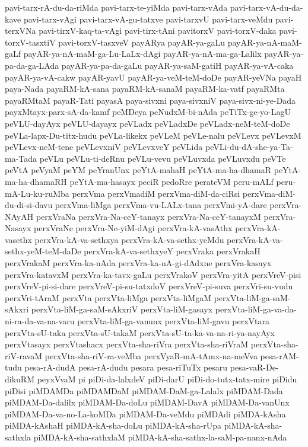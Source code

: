 {pavi-tarx-rA-du-da-riMda
pavi-tarx-te-yiMda
pavi-tarx-vAda
pavi-tarx-vA-du-da-kave
pavi-tarx-vAgi
pavi-tarx-vA-gu-tatxve
pavi-tarxvU
pavi-tarx-veMdu
pavi-terxVNa
pavi-tirxV-kaq-ta-vAgi
pavi-tirx-tAni
pavitorxV
pavi-torxV-daka
pavi-torxV-tasxtiV
pavi-torxV-tasxveV
payARya
payAR-ya-gaLu
payAR-ya-nA-maM-gaLf
payAR-ya-nA-maM-ga-Lu-LaLx-dAgi
payAR-ya-nA-ma-ga-Lalilx
payAR-ya-pa-da-ga-LAda
payAR-ya-pa-da-gaLu
payAR-ya-saM-gatiH
payAR-ya-vA-caka
payAR-ya-vA-cakw
payAR-yavU
payAR-ya-veM-teM-doDe
payAR-yeVNa
payaH
paya-Nada
payaRM-kA-sana
payaRM-kA-sanaM
payaRM-ka-vatf
payaRMta
payaRMtaM
payaR-Tati
payasA
paya-sivxni
paya-sivxniV
paya-sivx-ni-ye-Dada
payxMtayx-parx-sA-da-kamf
peMDeya
peNudxM-bi-nAda
peTiTx-ge-yo-LagU
peVLU-dayAyx
peVLU-dayayx
peVLadx
peVLadxDe
peVLadx-neM-teM-doDe
peVLa-lapx-Du-titx-hudu
peVLa-likekx
peVLeM
peVLe-nalu
peVLevx
peVLevxM
peVLevx-neM-tene
peVLevxniV
peVLevxveY
peVLida
peVLi-du-dA-she-ya-Ta-ma-Tada
peVLu
peVLu-ti-deRnu
peVLu-vevu
peVLuvxda
peVLuvxdu
peVTe
peVtA
peVyaM
peYM
peYranUnx
peYtA-mahaH
peYtA-ma-ha-dhamaR
peYtA-ma-ha-dhamaRH
peYtA-ma-hasayx
peciR
pedoRre
perateVM
peru-mALf
peru-mA-Lu-ku-ruMba
perxVma
perxVmadiM
perxVma-diM-da-ciRsi
perxVma-diM-du-di-si-davu
perxVma-liMga
perxVma-vu-LALx-tana
perxVmi-yA-dare
perxVra-NAyAH
perxVraNa
perxVra-Na-ceY-tanayx
perxVra-Na-ceY-tanayxM
perxVra-Nasayx
perxVraNe
perxVra-Ne-yiM-dAgi
perxVra-kA-vasAthx
perxVra-kA-vasethx
perxVra-kA-va-sethxya
perxVra-kA-va-sethx-yeMdu
perxVra-kA-va-sethx-yeM-teM-daDe
perxVra-kA-va-sethxyeY
perxVraka
perxVrakaH
perxVrakaM
perxVra-ka-nAda
perxVra-ka-nA-gi-dAdxne
perxVra-kasayx
perxVra-katavxM
perxVra-ka-tavx-gaLu
perxVrakoV
perxVra-yitA
perxVreV-pisi
perxVreV-pi-si-dare
perxVreV-pi-su-tatxdoV
perxVreV-pi-suva
perxVri-su-vudu
perxVri-tAraM
perxVta
perxVta-liMga
perxVta-liMgaM
perxVta-liM-ga-saM-sAkxri
perxVta-liM-ga-saM-sAkxriV
perxVta-liM-gasayx
perxVta-liM-ga-va-da-ni-ra-da-va-na-varu
perxVta-liM-ga-vanunx
perxVta-liM-gavu
perxVtara
perxVta-sU-taka
perxVta-sU-takaM
perxVta-sU-ta-ka-va-na-ri-ya-nayAyx
perxVtasayx
perxVtashacx
perxVta-sha-riVra
perxVta-sha-riVraM
perxVta-sha-riV-ravaM
perxVta-sha-riV-ra-veMba
perxVyaR-mA-tAmx-na-meVva
pesa-rAM-tudu
pesa-rA-dudA
pesa-rA-dudu
pesara
pesa-riTuTx
pesaru
pesa-vaR-De-dikuRM
peyxVvaM
pi
piDi-da-lalxdeV
piDi-darU
piDi-do-tutx-tatx-mire
piDidu
piDisi
piMDAMDa
piMDAMDaM
piMDAM-DaM-ga-Lalalx
piMDAM-Dada
piMDAM-Da-dalilx
piMDAM-Da-doLu
piMDAM-DavA
piMDAM-Da-vanUnx
piMDAM-Da-va-no-La-koMDa
piMDAM-Da-veMdu
piMDAdi
piMDA-kAsha
piMDA-kAshaH
piMDA-kA-sha-doLu
piMDA-kA-sha-rUpa
piMDA-kA-sha-sathxla
piMDA-kA-sha-sathxlaM
piMDA-kA-sha-sathx-la-saM-pa-nanx-nAda
}

